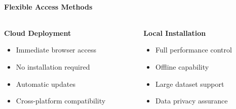 
{
  \framesubtitle{Flexible Access Methods}
  
  \begin{figure}[!h]
    \centering
    
  \end{figure}

  \begin{columns}[T]
    \begin{column}{0.5\textwidth}
      \textbf{Cloud Deployment}
      \begin{itemize}
        \item Immediate browser access
        \item No installation required
        \item Automatic updates
        \item Cross-platform compatibility
      \end{itemize}
    \end{column}
    
    \begin{column}{0.5\textwidth}
      \textbf{Local Installation}
      \begin{itemize}
        \item Full performance control
        \item Offline capability
        \item Large dataset support
        \item Data privacy assurance
      \end{itemize}
    \end{column}
  \end{columns}
}

